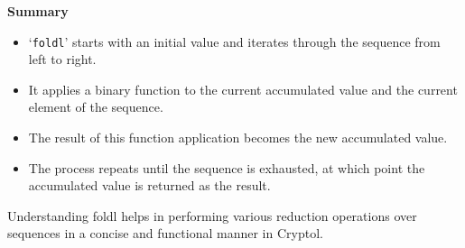 \textbf{Summary}
\begin{itemize}
	\item `\texttt{foldl}' starts with an initial value and iterates through the sequence from left to right.
	\item It applies a binary function to the current accumulated value and the current element of the sequence.
	\item The result of this function application becomes the new accumulated value.
	\item The process repeats until the sequence is exhausted, at which point the accumulated value is returned as the result.
\end{itemize}
Understanding foldl helps in performing various reduction operations over sequences in a concise and functional manner in Cryptol.